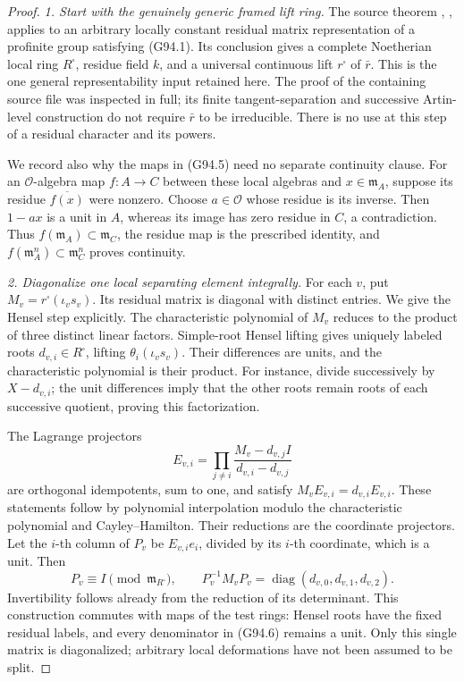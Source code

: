\begin{proof}
\emph{1. Start with the genuinely generic framed lift ring.}
The source theorem
, ,
applies to an arbitrary locally constant residual matrix
representation of a profinite group satisfying (G94.1).
Its conclusion gives a complete Noetherian local ring
\(R^{\square}\), residue field \(k\), and a universal
continuous lift \(r^{\square}\) of \(\bar r\).
This is the one general representability input retained here.
The proof of the containing source file was inspected in full;
its finite tangent-separation and successive Artin-level
construction do not require \(\bar r\) to be irreducible.
There is no use at this step of a residual character and its
powers.

We record also why the maps in (G94.5) need no separate
continuity clause.  For an \(\mathcal O\)-algebra map
\(f:A\to C\) between these local algebras and \(x\in\mathfrak m_A\),
suppose its residue \(\overline{f(x)}\) were nonzero.
Choose \(a\in\mathcal O\) whose residue is its inverse.
Then \(1-ax\) is a unit in \(A\), whereas its image has zero
residue in \(C\), a contradiction.  Thus
\(f(\mathfrak m_A)\subset\mathfrak m_C\), the residue map is
the prescribed identity, and
\(f(\mathfrak m_A^n)\subset\mathfrak m_C^n\) proves continuity.

\emph{2. Diagonalize one local separating element integrally.}
For each \(v\), put
\(M_v=r^{\square}(\iota_v s_v)\).
Its residual matrix is diagonal with distinct entries.
We give the Hensel step explicitly.
The characteristic polynomial of \(M_v\) reduces to the
product of three distinct linear factors.  Simple-root
Hensel lifting gives uniquely labeled roots
\(d_{v,i}\in R^{\square}\), lifting
\(\theta_i(\iota_v s_v)\).  Their differences are units,
and the characteristic polynomial is their product.
For instance, divide successively by \(X-d_{v,i}\);
the unit differences imply that the other roots remain
roots of each successive quotient, proving this factorization.

The Lagrange projectors
\[
 E_{v,i}=\prod_{j\ne i}
       \frac{M_v-d_{v,j}I}{d_{v,i}-d_{v,j}}
 \tag{G94.6}
\]
are orthogonal idempotents, sum to one, and satisfy
\(M_vE_{v,i}=d_{v,i}E_{v,i}\).  These statements follow by
polynomial interpolation modulo the characteristic polynomial
and Cayley--Hamilton.  Their reductions are the coordinate
projectors.  Let the \(i\)-th column of \(P_v\) be
\(E_{v,i}e_i\), divided by its \(i\)-th coordinate, which
is a unit.  Then
\[
 P_v\equiv I\pmod{\mathfrak m_{R^{\square}}},\qquad
 P_v^{-1}M_vP_v=\operatorname{diag}(d_{v,0},d_{v,1},d_{v,2}).
 \tag{G94.7}
\]
Invertibility follows already from the reduction of its
determinant.  This construction commutes with maps of the
test rings: Hensel roots have the fixed residual labels,
and every denominator in (G94.6) remains a unit.
Only this single matrix is diagonalized; arbitrary local
deformations have not been assumed to be split.


\end{proof}
